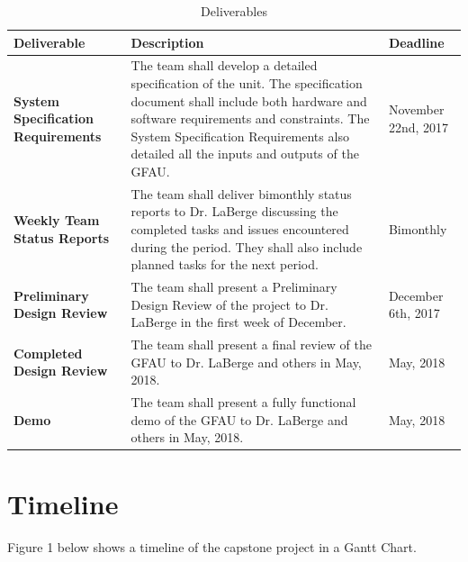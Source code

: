 \documentclass[12pt]{extarticle}
\begin{document}
    \begin{table}[h]

        \renewcommand{\arraystretch}{1.8}
        \caption{Deliverables}
        \centering

        \begin{tabular}{ | p{10em} | p{16em} | l |}

            \hline \textbf{Deliverable} & \textbf{Description} &
            \textbf{Deadline} \\

            \hline \textbf{System Specification Requirements} & The team shall
            develop a detailed specification of the unit. The specification
            document shall include both hardware and software requirements and
            constraints. The System Specification Requirements also detailed
            all the inputs and outputs of the GFAU. & November 22nd, 2017 \\

            \hline \textbf{Weekly Team Status Reports} & The team shall deliver
            bimonthly status reports to Dr. LaBerge discussing the completed
            tasks and issues encountered during the period. They shall also
            include planned tasks for the next period. & Bimonthly \\

            \hline \textbf{Preliminary Design Review} & The team shall present
            a Preliminary Design Review of the project to Dr. LaBerge in the
            first week of December. & December 6th, 2017 \\

            \hline \textbf{Completed Design Review} & The team shall present a
            final review of the GFAU to Dr. LaBerge and others in May, 2018. &
            May, 2018 \\

            \hline \textbf{Demo} & The team shall present a fully functional
            demo of the GFAU to Dr. LaBerge and others in May, 2018. & May,
            2018 \\

            \hline

        \end{tabular}
    \label{deliverables}
    \end{table}

    \section{Timeline} Figure 1 below shows a timeline of the capstone project
    in a Gantt Chart.
\end{document}
